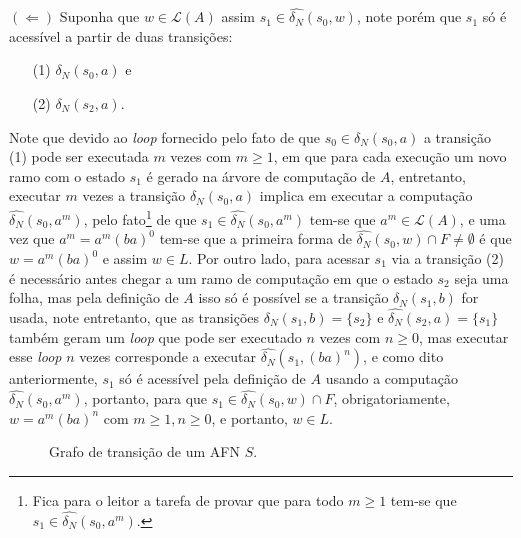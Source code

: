 \begin{prova}
	$(\Leftarrow)$ Suponha que $w \in \mathcal{L}(A)$ assim $s_1 \in \widehat{\delta_N}(s_0, w)$, note porém que $s_1$ só é acessível a partir de duas transições: 
	\begin{itemize}
		\item[(1)] $\delta_N(s_0, a)$ e
		\item[(2)] $\delta_N(s_2, a)$. 
	\end{itemize}
	Note que devido ao \textit{loop} fornecido pelo fato de que $s_0 \in \delta_N(s_0, a)$ a transição (1) pode ser executada $m$ vezes com $m \geq 1$, em que para cada execução um novo ramo com o estado $s_1$ é gerado na árvore de computação de $A$, entretanto, executar $m$ vezes a transição $\delta_N(s_0, a)$ implica em executar a computação $\widehat{\delta_N}(s_0, a^m)$, pelo fato\footnote{Fica para o leitor a tarefa de provar que para todo $m \geq 1$ tem-se que $s_1 \in \widehat{\delta_N}(s_0, a^m)$.} de que $s_1 \in \widehat{\delta_N}(s_0, a^m)$ tem-se que $a^m \in \mathcal{L}(A)$, e uma vez que $a^m = a^m(ba)^0$ tem-se que a primeira forma de $\widehat{\delta_N}(s_0, w) \cap F \neq \emptyset$ é que $w = a^m(ba)^0$ e assim $w \in L$. Por outro lado, para acessar $s_1$ via a transição (2) é necessário antes chegar a um ramo de computação em que o estado $s_2$ seja uma folha, mas pela definição de $A$ isso só é possível se a transição $\delta_N(s_1, b)$ for usada, note entretanto, que as transições $\delta_N(s_1, b) = \{s_2\}$ e $\widehat{\delta_N}(s_2, a) = \{s_1\}$ também geram um \textit{loop} que pode ser executado $n$ vezes com $n \geq 0$, mas executar esse \textit{loop} $n$ vezes corresponde a executar $\widehat{\delta_N}(s_1, (ba)^n)$, e como dito anteriormente, $s_1$ só é acessível pela definição de $A$ usando a computação $\widehat{\delta_N}(s_0, a^m)$, portanto, para que $s_1 \in \widehat{\delta_N}(s_0, w) \cap F$, obrigatoriamente, $w = a^m(ba)^n$ com $m \geq 1, n \geq 0$, e portanto, $w \in L$.
\end{prova}

\begin{figure}[H]
  \centering
  \caption{Grafo de transição de um AFN $S$.}
  \label{fig:AFN4}
\end{figure}

